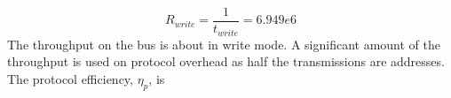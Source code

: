 \begin{equation}\label{eq:7_2_1_Write_ThroughPut}
    R_{write} = \frac{1}{t_{write}} = 6.949e6 
\end{equation}
The throughput on the bus is about  in write mode. A significant amount of the throughput is used on protocol overhead as half the transmissions are addresses. The protocol efficiency, $\eta_{p}$, is 
